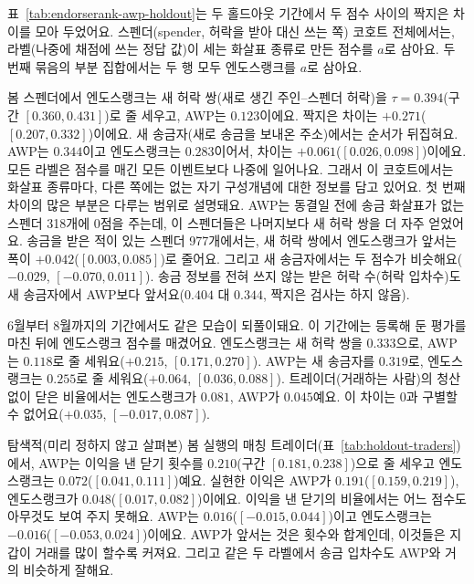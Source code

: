 
표~\ref{tab:endorserank-awp-holdout}는 두 홀드아웃 기간에서 두 점수 사이의 짝지은 차이를 모아 두었어요. 스펜더(spender, 허락을 받아 대신 쓰는 쪽) 코호트 전체에서는, 라벨(나중에 채점에 쓰는 정답 값)이 세는 화살표 종류로 만든 점수를 $a$로 삼아요. 두 번째 묶음의 부분 집합에서는 두 행 모두 엔도스랭크를 $a$로 삼아요.



봄 스펜더에서 엔도스랭크는 새 허락 쌍(새로 생긴 주인–스펜더 허락)을 $\tau=0.394$(구간 $[0.360,0.431]$)로 줄 세우고, AWP는 $0.123$이에요. 짝지은 차이는 $+0.271$($[0.207,0.332]$)이에요. 새 송금자(새로 송금을 보내온 주소)에서는 순서가 뒤집혀요. AWP는 $0.344$이고 엔도스랭크는 $0.283$이어서, 차이는 $+0.061$($[0.026,0.098]$)이에요. 모든 라벨은 점수를 매긴 모든 이벤트보다 나중에 일어나요. 그래서 이 코호트에서는 화살표 종류마다, 다른 쪽에는 없는 자기 구성개념에 대한 정보를 담고 있어요. 첫 번째 차이의 많은 부분은 다루는 범위로 설명돼요. AWP는 동결일 전에 송금 화살표가 없는 스펜더 318개에 0점을 주는데, 이 스펜더들은 나머지보다 새 허락 쌍을 더 자주 얻었어요. 송금을 받은 적이 있는 스펜더 977개에서는, 새 허락 쌍에서 엔도스랭크가 앞서는 폭이 $+0.042$($[0.003,0.085]$)로 줄어요. 그리고 새 송금자에서는 두 점수가 비슷해요($-0.029$, $[-0.070,0.011]$). 송금 정보를 전혀 쓰지 않는 받은 허락 수(허락 입차수)도 새 송금자에서 AWP보다 앞서요($0.404$ 대 $0.344$, 짝지은 검사는 하지 않음).

6월부터 8월까지의 기간에서도 같은 모습이 되풀이돼요. 이 기간에는 등록해 둔 평가를 마친 뒤에 엔도스랭크 점수를 매겼어요. 엔도스랭크는 새 허락 쌍을 $0.333$으로, AWP는 $0.118$로 줄 세워요($+0.215$, $[0.171,0.270]$). AWP는 새 송금자를 $0.319$로, 엔도스랭크는 $0.255$로 줄 세워요($+0.064$, $[0.036,0.088]$). 트레이더(거래하는 사람)의 청산 없이 닫은 비율에서는 엔도스랭크가 $0.081$, AWP가 $0.045$예요. 이 차이는 0과 구별할 수 없어요($+0.035$, $[-0.017,0.087]$).

탐색적(미리 정하지 않고 살펴본) 봄 실행의 매칭 트레이더(표~\ref{tab:holdout-traders})에서, AWP는 이익을 낸 닫기 횟수를 $0.210$(구간 $[0.181,0.238]$)으로 줄 세우고 엔도스랭크는 $0.072$($[0.041,0.111]$)예요. 실현한 이익은 AWP가 $0.191$($[0.159,0.219]$), 엔도스랭크가 $0.048$($[0.017,0.082]$)이에요. 이익을 낸 닫기의 비율에서는 어느 점수도 아무것도 보여 주지 못해요. AWP는 $0.016$($[-0.015,0.044]$)이고 엔도스랭크는 $-0.016$($[-0.053,0.024]$)이에요. AWP가 앞서는 것은 횟수와 합계인데, 이것들은 지갑이 거래를 많이 할수록 커져요. 그리고 같은 두 라벨에서 송금 입차수도 AWP와 거의 비슷하게 잘해요.
